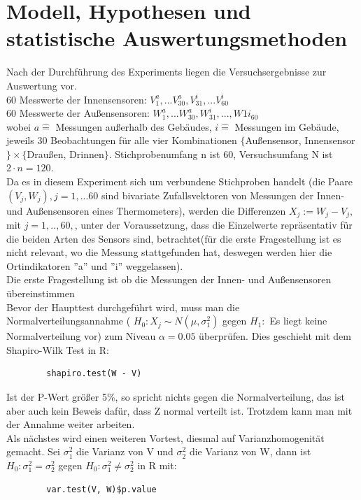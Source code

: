 \documentclass[ ngerman, fontsize= 12pt, paper=a4, headings=big, titlepage=true]{article}
\begin{document}
	
	
	\section{Modell, Hypothesen und statistische Auswertungsmethoden}
	Nach der Durchführung des Experiments liegen die Versuchsergebnisse zur Auswertung vor. \\
	60 Messwerte der Innensensoren:  $ V^a_{1}, ...V^a_{30}, V^i_{31}, ... V^i_{60} $   \\
	60 Messwerte der Außensensoren:  $ W^a_1, ...W^a_{30},W^i_{31},..., W1 i_{60} $ \\
	wobei $a \hat{=}$ Messungen außerhalb des Gebäudes,   $i \hat{=} $ Messungen im Gebäude, jeweils 30 Beobachtungen für alle vier Kombinationen $\{$Außensensor, Innensensor$\} \times \{$Draußen, Drinnen$\} $. Stichprobenumfang n ist 60, Versuchsumfang N ist $2 \cdot n =120 $. \\
	Da es in diesem Experiment sich um verbundene Stichproben handelt (die Paare $ ( V_j, W_j ), j = 1,...60 $ sind bivariate Zufallsvektoren von Messungen der Innen- und Außensensoren eines Thermometers), werden die Differenzen $ X_j := W_j - V_j,$ mit  $j = 1, .., 60, $, unter der Voraussetzung, dass die Einzelwerte repräsentativ für die beiden Arten des Sensors sind, betrachtet(für die erste Fragestellung ist es nicht relevant, wo die Messung stattgefunden hat, deswegen werden hier die Ortindikatoren ''a'' und ''i'' weggelassen). \\
	Die erste Fragestellung ist ob die Messungen der Innen- und Außensensoren übereinstimmen \\
	Bevor der Haupttest durchgeführt wird, muss man die Normalverteilungsannahme ( $ H_0: X_j  \sim N( \mu , \sigma_1^2 )$ gegen $H_1:$ Es liegt keine Normalverteilung vor) zum Niveau $ \alpha = 0.05 $  überprüfen. Dies geschieht mit dem Shapiro-Wilk Test in R:
	\begin{lstlisting}
		shapiro.test(W - V)
	\end{lstlisting}
	Ist der P-Wert größer 5\%, so spricht nichts gegen die Normalverteilung, das ist aber auch kein Beweis dafür, dass Z normal verteilt ist. Trotzdem kann man mit der Annahme weiter arbeiten. \\ 
	Als nächstes wird einen weiteren Vortest, diesmal auf Varianzhomogenität gemacht. Sei $\sigma^2_1 $ die Varianz von V und $\sigma^2_2 $ die Varianz von W, dann ist  
	$ H_0: \sigma^2_1 = \sigma^2_2  $ gegen $ H_0: \sigma^2_1 \neq \sigma^2_2  $ in R mit: \begin{lstlisting}
		var.test(V, W)$p.value
	\end{lstlisting}
\end{document}

